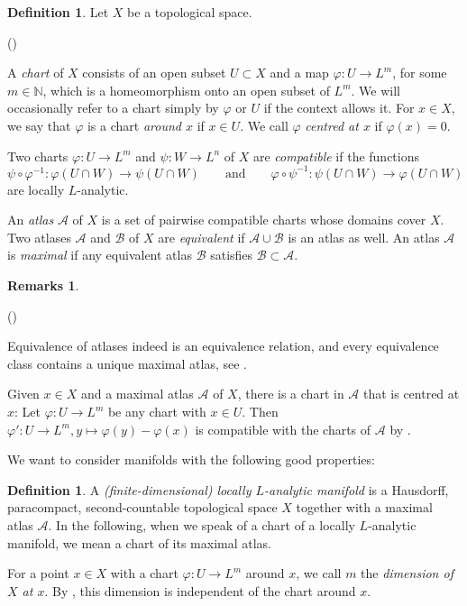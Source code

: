 \documentclass[a4paper, reqno, 10pt]{amsart}
\theoremstyle{definition}
\newtheorem{definition}[theorem]{Definition}
\newtheorem{remarks}[theorem]{Remarks}
\newenvironment{altenumerate}
	{\begin{list}
		{\textup{(\theenumi)} }
		{\usecounter{enumi}
			\setlength{\labelwidth}{0pt}
			\setlength{\labelsep}{0pt}
			\setlength{\leftmargin}{0pt}
			\setlength{\itemsep}{0pt}
			\setlength{\topsep}{0pt}
		\renewcommand{\theenumi}{\roman{enumi}}
		}}
	{\end{list}}
\numberwithin{equation}{section}
\newcommand{\lra}{\longrightarrow}
\newcommand{\mto}{\mapsto}
\newcommand{\ra}{\rightarrow}
\newcommand{\BN}{{\mathbb {N}}}
\newcommand{\CA}{{\mathcal {A}}}
\newcommand{\CB}{{\mathcal {B}}}
\begin{document}
\begin{definition}
	Let $X$ be a topological space.
	\begin{altenumerate}
		\item
		A \textit{chart} of $X$ consists of an open subset $U\subset X$ and a map $\varphi \colon U \ra L^m$, for some $m\in\BN$, which is a homeomorphism onto an open subset of $L^m$.
		We will occasionally refer to a chart simply by $\varphi$ or $U$ if the context allows it. 
		For $x\in X$, we say that $\varphi$ is a chart \textit{around $x$} if $x\in U$.
		We call $\varphi$ \textit{centred at $x$} if $\varphi(x) =0$.
		\item 
		Two charts $\varphi\colon U \ra L^{m}$ and $\psi\colon W\ra L^{n}$ of $X$ are \textit{compatible} if the functions
		\begin{equation*}
			\psi \circ \varphi^{-1} \colon \varphi(U \cap W) \lra \psi(U\cap W) \qquad\text{and}\qquad \varphi \circ \psi^{-1} \colon \psi(U\cap W) \lra \varphi(U\cap W)
		\end{equation*}
		are locally $L$-analytic.
		\item
		An \textit{atlas} $\CA$ of $X$ is a set of pairwise compatible charts whose domains cover $X$.
		Two atlases $\CA$ and $\CB$ of $X$ are \textit{equivalent} if $\CA \cup \CB$ is an atlas as well.
		An atlas $\CA$ is \textit{maximal} if any equivalent atlas $\CB$ satisfies $\CB \subset \CA$.
	\end{altenumerate}
\end{definition}


\begin{remarks}
	\begin{altenumerate}
		\item
		Equivalence of atlases indeed is an equivalence relation, and every equivalence class contains a unique maximal atlas, see \cite[Rmk.\ 7.2]{Schneider11pAdicLieGrps}.
		\item
		Given $x\in X$ and a maximal atlas $\CA$ of $X$, there is a chart in $\CA$ that is centred at $x$:
		Let $\varphi\colon U \ra L^m$ be any chart with $x\in U$.
		Then $\varphi'\colon U \ra L^m, y \mto \varphi(y)-\varphi(x)$ is compatible with the charts of $\CA$ by .		
	\end{altenumerate}
\end{remarks}


We want to consider manifolds with the following good properties:

\begin{definition}
	A \textit{(finite-dimensional) locally $L$-analytic manifold} is a Hausdorff, paracompact, second-countable topological space $X$ together with a maximal atlas $\CA$.
	In the following, when we speak of a chart of a locally $L$-analytic manifold, we mean a chart of its maximal atlas.
	
	
	For a point $x\in X$ with a chart $\varphi \colon U \ra L^m$ around $x$, we call $m$ the \textit{dimension of $X$ at $x$}.
	By \cite[Lemma 7.1]{Schneider11pAdicLieGrps}, this dimension is independent of the chart around $x$.
\end{definition}
\end{document}
